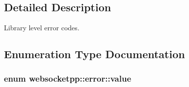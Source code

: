 \subsection{Detailed Description}
Library level error codes. 

\subsection{Enumeration Type Documentation}
\hypertarget{namespacewebsocketpp_1_1error_a0558d884e44e79146ad4947aea63f68d}{}
\subsubsection[{value}]{\setlength{\rightskip}{0pt plus 5cm}enum {\bf websocketpp\+::error\+::value}}\label{namespacewebsocketpp_1_1error_a0558d884e44e79146ad4947aea63f68d}
